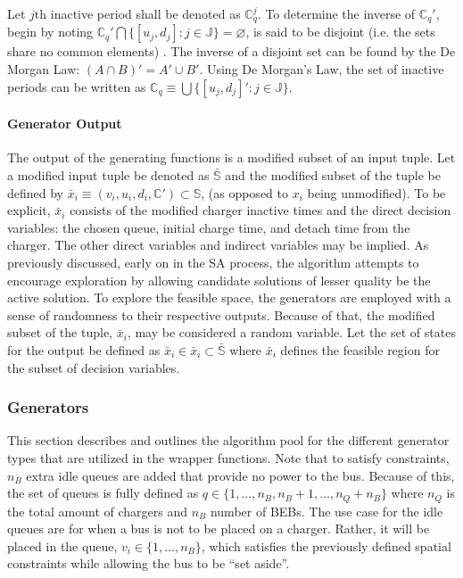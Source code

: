 \documentclass[11pt,a4paper,final]{article}
\newcommand{\C}{\mathbb{C}}                 %
\newcommand{\Sol}{\mathbb{S}}               %
\newcommand{\Jsetq}{\mathbb{J}}             %
\begin{document}
Let \(j\text{th}\) inactive period shall be denoted as \(\C^j_q\). To determine the inverse of \(\C_q'\), begin by noting
\(\C_q' \bigcap \{[u_j, d_j] : j \in \Jsetq\} = \varnothing\), is said to be disjoint (i.e. the sets share no common elements)
\cite{halmos-1974-naive-set-theor}. The inverse of a disjoint set can be found by the De Morgan Law: \((A \cap B)' = A' \cup
B'\). Using De Morgan's Law, the set of inactive periods can be written as \(\C_q \equiv \bigcup \{[u_j, d_j]': j \in \Jsetq\}\).

\paragraph{Generator Output}
\label{sec:org8a9e205}
The output of the generating functions is a modified subset of an input tuple. Let a modified input tuple be denoted as
\(\bar{\Sol}\) and the modified subset of the tuple be defined by \(\bar{x}_i \equiv (v_i, u_i, d_i, \C') \subset \Sol\), (as opposed
to \(x_i\) being unmodified). To be explicit, \(\bar{x}_i\) consists of the modified charger inactive times and the direct
decision variables: the chosen queue, initial charge time, and detach time from the charger. The other direct variables
and indirect variables may be implied. As previously discussed, early on in the SA process, the algorithm attempts to
encourage exploration by allowing candidate solutions of lesser quality be the active solution. To explore the feasible
space, the generators are employed with a sense of randomness to their respective outputs. Because of that, the modified
subset of the tuple, \(\bar{x}_i\), may be considered a random variable. Let the set of states for the output be defined
as \(\bar{x}_i \in \bar{x}_i \subset \bar{\Sol}\) where \(\bar{x}_i\) defines the feasible region for the subset of decision
variables.

\subsubsection{Generators}
\label{sec:generators}
This section describes and outlines the algorithm pool for the different generator types that are utilized in the
wrapper functions. Note that to satisfy constraints, \(n_B\) extra idle queues are added that provide no power to the bus.
Because of this, the set of queues is fully defined as \(q \in \{1,..., n_B, n_B+1,..., n_Q+n_B\}\) where \(n_Q\) is the total
amount of chargers and \(n_B\) number of BEBs. The use case for the idle queues are for when a bus is not to be placed on
a charger. Rather, it will be placed in the queue, \(v_i \in \{1,..., n_B\}\), which satisfies the previously defined
spatial constraints while allowing the bus to be ``set aside''.
\end{document}
